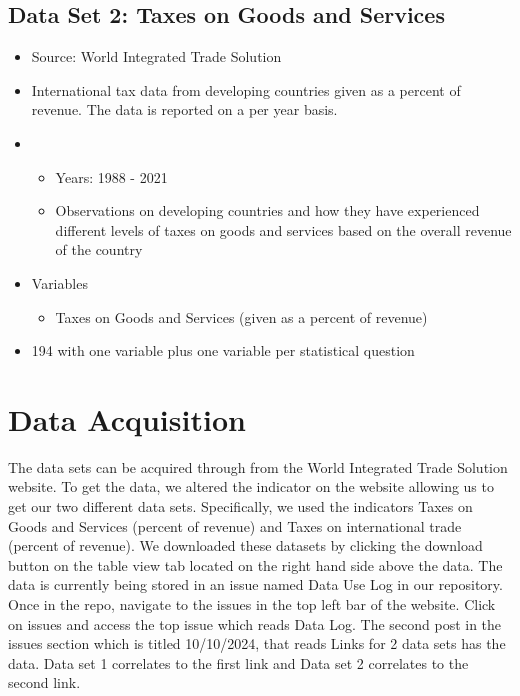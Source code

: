 \documentclass[12pt]{article}
\begin{document}
\subsection{Data Set 2: Taxes on Goods and Services}

\begin{itemize}
  \item Source: World Integrated Trade Solution
  \item International tax data from developing countries given as a percent of revenue. The data is reported on a per year basis. 
  \item 
    \begin{itemize}
        \item Years: 1988 - 2021
        \item Observations on developing countries and how they have experienced different levels of taxes on goods and services based on the overall revenue of the country
    \end{itemize}
  \item Variables
    \begin{itemize}
        \item Taxes on Goods and Services (given as a percent of revenue)
    \end{itemize}
  \item 194 with one variable plus one variable per statistical question
\end{itemize}

\noindent

\section{Data Acquisition}
\label{sec:theory}

The data sets can be acquired through from the World Integrated Trade Solution website. To get the data, we altered the indicator on the website allowing us to get our two different data sets. Specifically, we used the indicators Taxes on Goods and Services (percent of revenue) and Taxes on international trade (percent of revenue). We downloaded these datasets by clicking the download button on the table view tab located on the right hand side above the data. The data is currently being stored in an issue named Data Use Log in our repository. Once in the repo, navigate to the issues in the top left bar of the website. Click on issues and access the top issue which reads Data Log. The second post in the issues section which is titled 10/10/2024, that reads Links for 2 data sets has the data. Data set 1 correlates to the first link and Data set 2 correlates to the second link.
\end{document}

